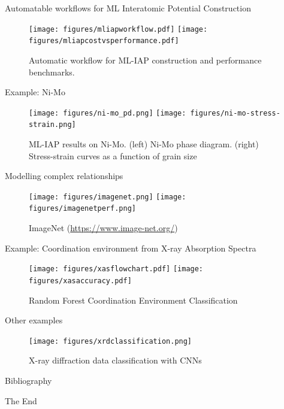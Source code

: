 \documentclass[aspectratio=169]{beamer}
\begin{document}
    \begin{frame}{Automatable workflows for ML Interatomic Potential Construction}
        \begin{figure}
            \centering
            \texttt{[image: figures/mliapworkflow.pdf]}
            \texttt{[image: figures/mliapcostvsperformance.pdf]}
            \caption{Automatic workflow for ML-IAP construction and performance benchmarks.\cite{zuoPerformanceCostAssessment2020}}
        \end{figure}
    \end{frame}


    \begin{frame}{Example: Ni-Mo}
        \begin{figure}
            \centering
            \texttt{[image: figures/ni-mo\_pd.png]}
            \texttt{[image: figures/ni-mo-stress-strain.png]}
            \caption{ML-IAP results on Ni-Mo. (left) Ni-Mo phase diagram. (right) Stress-strain curves as a function of grain size\cite{zuoPerformanceCostAssessment2020}}
        \end{figure}
    \end{frame}


    \begin{frame}{Modelling complex relationships}
        \begin{figure}
            \centering
            \texttt{[image: figures/imagenet.png]}
            \texttt{[image: figures/imagenetperf.png]}
            \caption{ImageNet (\url{https://www.image-net.org/})}
        \end{figure}
    \end{frame}


    \begin{frame}{Example: Coordination environment from X-ray Absorption Spectra}
        \begin{figure}
            \centering
            \texttt{[image: figures/xasflowchart.pdf]}
            \texttt{[image: figures/xasaccuracy.pdf]}
            \caption{Random Forest Coordination Environment Classification\cite{zhengRandomForestModels2020}}
        \end{figure}
    \end{frame}


    \begin{frame}{Other examples}
        \begin{figure}
            \centering
            \texttt{[image: figures/xrdclassification.png]}
            \caption{X-ray diffraction data classification with CNNs\cite{oviedoFastInterpretableClassification2019}}
        \end{figure}
    \end{frame}

    \begin{frame}[allowframebreaks]{Bibliography}
        
        
    \end{frame}


    \begin{frame}
        \Huge{\centerline{The End}}
    \end{frame}
\end{document}
